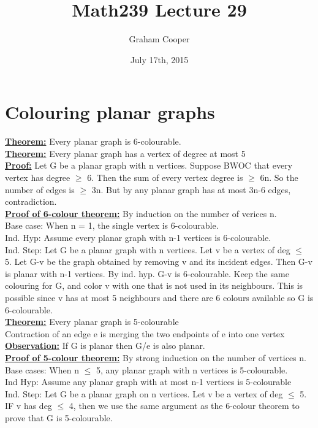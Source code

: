 \documentclass[12pt]{article}
\title{\vspace{-15ex}Math239 Lecture 29\vspace{-1ex}}
\date{July 17th, 2015}
\author{Graham Cooper}
\newcommand{\myt}[1]{\textbf{\underline{#1}}}
\begin{document}
	\maketitle
	\section*{Colouring planar graphs}
	\myt{Theorem:} Every planar graph is 6-colourable.\\
	
	\myt{Theorem:} Every planar graph has a vertex of degree at most 5\\
	
	\myt{Proof:} Let G be a planar graph with n vertices. Suppose BWOC that every vertex has degree $\geq$ 6. Then the sum of every vertex degree is $\geq$ 6n. So the number of edges is $\geq$ 3n. But by any planar graph has at most 3n-6 edges, contradiction.\\
	
	\myt{Proof of 6-colour theorem:} By induction on the number of verices n. \\
	Base case: When n = 1, the single vertex is 6-colourable.\\
	Ind. Hyp: Assume every planar graph with n-1 vertices is 6-colourable.\\
	Ind. Step: Let G be a planar graph with n vertices. Let v be a vertex of deg $\leq$ 5. Let G-v be the graph obtained by removing v and its incident edges. Then G-v is planar with n-1 vertices. By ind. hyp. G-v is 6-colourable. Keep the same colouring for G, and color v with one that is not used in its neighbours. This is possible since v has at most 5 neighbours and there are 6 colours available so G is 6-colourable.\\
	
	\myt{Theorem:} Every planar graph is 5-colourable\\
	
	Contraction of an edge e is merging the two endpoints of e into one vertex\\
	
	\myt{Observation:} If G is planar then G/e is also planar.\\
	
	\myt{Proof of 5-colour theorem:} By strong induction on the number of vertices n.\\
	Base cases: When n $\leq$ 5, any planar graph with n vertices is 5-colourable.\\
	Ind Hyp: Assume any planar graph with at most n-1 vertices is 5-colourable\\
	Ind. Step: Let G be a planar graph on n vertices. Let v be a vertex of deg $\leq$ 5. IF v has deg $\leq$ 4, then we use the same argument as the 6-colour theorem to prove that G is 5-colourable.\\
	
\end{document}
